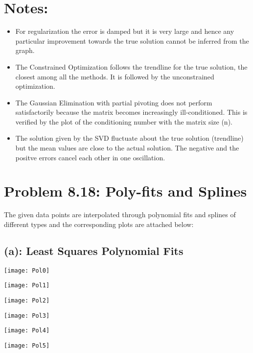 \section*{Notes: }
\begin{itemize}
\item For regularization the error is damped but it is very large and hence any particular improvement towards the true solution cannot be inferred from the graph. 
\item The Constrained Optimization follows the trendline for the true solution, the closest among all the methods. It is followed by the unconstrained optimization. 
\item The Gaussian Elimination with partial pivoting does not perform satisfactorily because the matrix becomes increasingly ill-conditioned. This is verified by the plot of the conditioning number with the matrix size (n).
\item The solution given by the SVD fluctuate about the true solution (trendline) but the mean values are close to the actual solution. The negative and the positve errors cancel each other in one oscillation. 
\end{itemize}
\newpage\section*{Problem 8.18: Poly-fits and Splines}
The given data points are interpolated through polynomial fits and splines of different types and the corresponding plots are attached below: 
\subsection*{(a): Least Squares Polynomial Fits}
\begin{center}
\texttt{[image: Pol0]}
\end{center}
\begin{center}
\texttt{[image: Pol1]}
\end{center}
\begin{center}
\texttt{[image: Pol2]}
\end{center}
\begin{center}
\texttt{[image: Pol3]}
\end{center}
\begin{center}
\texttt{[image: Pol4]}
\end{center}
\begin{center}
\texttt{[image: Pol5]}
\end{center}
